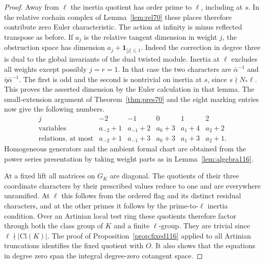 \documentclass[a4paper,11pt]{article}
\theoremstyle{definition}
\theoremstyle{remark}
\numberwithin{equation}{section}
\begin{document}
\begin{proof}
Away from \(\ell\) the inertia quotient has order prime to
\(\ell\), including at \(s\). In the relative cochain complex
of Lemma~\ref{lem:rel70} these places therefore contribute
zero Euler characteristic. The action at infinity is minus
reflected transpose as before. If \(a_j\) is the relative
tangent dimension in weight \(j\), the obstruction space has
dimension \(a_j+\mathbf1_{|j|\le1}\). Indeed the correction
in degree three is dual to the global invariants of the
dual twisted module. Inertia at \(\ell\) excludes all weights
except possibly \(j=r=1\). In that case the two characters
are \(\bar\alpha^{-1}\) and \(\bar\eta\bar\alpha^{-1}\).
The first is odd and the second is nontrivial on inertia
at \(s\), since \(s\nmid N_*\ell\). This proves the asserted
dimension by the Euler calculation in that lemma. The
small-extension argument of Theorem~\ref{thm:pres70} and
the eight marking entries now give the following numbers.
\[
 \begin{array}{c|rrrrr}
  j&-2&-1&0&1&2\\ \hline
  \text{variables}&a_{-2}+1&a_{-1}+2&a_0+3&a_1+4&a_2+2\\
  \text{relations, at most}&a_{-2}+1&a_{-1}+3&a_0+3&a_1+3&a_2+1 .
 \end{array}
\]
Homogeneous generators and the ambient formal chart are obtained
from the power series presentation by taking weight parts as
in Lemma~\ref{lem:algebra116}.

At a fixed lift all matrices on \(G_K\) are diagonal. The
quotients of their three coordinate characters by their
prescribed values reduce to one and are everywhere unramified.
At \(\ell\) this follows from the ordered flag and its distinct
residual characters, and at the other primes it follows by the
prime-to-\(\ell\) inertia condition. Over an Artinian local
test ring these quotients therefore factor through both the
class group of \(K\) and a finite \(\ell\)-group. They are
trivial since \(\ell\nmid|\mathrm{Cl}(K)|\). The proof of
Proposition~\ref{prop:fixed116} applied to all Artinian
truncations identifies the fixed quotient with \(O\). It also
shows that the equations in degree zero span the integral
degree-zero cotangent space.


\end{proof}
\end{document}
